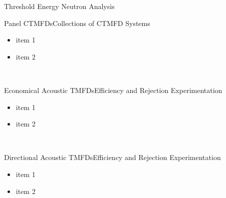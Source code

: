\begin{cell}{6}{12}{Threshold Energy Neutron Analysis}{}
  \begin{cell}{2}{3}{Panel CTMFDs}{Collections of CTMFD Systems}
    \begin{itemize}
      \item item 1
      \item item 2
    \end{itemize}
  \end{cell}%
  \hspace*{\fill}
  \begin{cell}{2}{3}{}{}
  \end{cell} \\
  \vspace*{\fill}
  \begin{cell}{3}{3}{Economical Acoustic TMFDs}{Efficiency and Rejection Experimentation}
    \begin{itemize}
      \item item 1
      \item item 2
    \end{itemize}
  \end{cell}%
  \hspace*{\fill}
  \begin{cell}{3}{3}{}{}
  \end{cell} \\
  \vspace*{\fill}
  \begin{cell}{3}{3}{}{}
  \end{cell}
  \hspace*{\fill}
  \begin{cell}{3}{3}{Directional Acoustic TMFDs}{Efficiency and Rejection Experimentation}
    \begin{itemize}
      \item item 1
      \item item 2
    \end{itemize}
  \end{cell}%
\end{cell}%
\hspace*{.5in}
